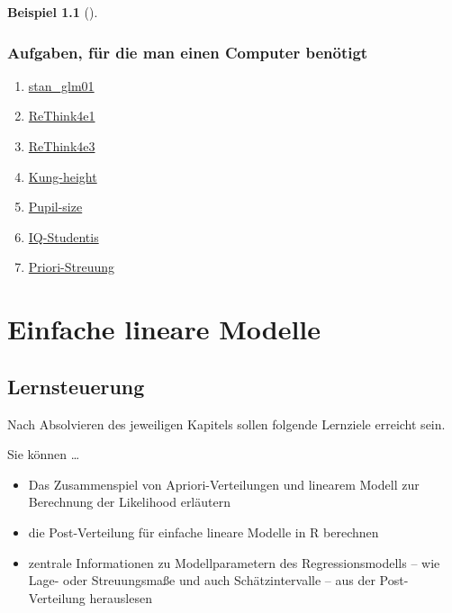 \documentclass[
  ngerman,
  letterpaper,
  twoside,
  open=any]{scrbook}
\providecommand{\tightlist}{%
  \setlength{\itemsep}{0pt}\setlength{\parskip}{0pt}}\usepackage{longtable,booktabs,array}
\theoremstyle{definition}
\newtheorem{example}{Beispiel}[chapter]
\theoremstyle{plain}
\theoremstyle{definition}
\theoremstyle{definition}
\theoremstyle{remark}
\begin{document}
\begin{example}[]
\subsection{Aufgaben, für die man einen Computer
benötigt}\label{aufgaben-fuxfcr-die-man-einen-computer-benuxf6tigt}

\begin{enumerate}
\def\labelenumi{\arabic{enumi}.}
\tightlist
\item
  \href{https://datenwerk.netlify.app/posts/stan_glm01/stan_glm01.html}{stan\_glm01}
\item
  \href{https://datenwerk.netlify.app/posts/rethink4e1/rethink4e1}{ReThink4e1}
\item
  \href{https://datenwerk.netlify.app/posts/rethink4e3/rethink4e3}{ReThink4e3}
\item
  \href{https://datenwerk.netlify.app/posts/kung-height/kung-height}{Kung-height}
\item
  \href{https://datenwerk.netlify.app/posts/pupil-size/pupil-size}{Pupil-size}
\item
  \href{https://datenwerk.netlify.app/posts/iq-studentis/iq-studentis}{IQ-Studentis}
\item
  \href{https://datenwerk.netlify.app/posts/priori-streuung/priori-streuung}{Priori-Streuung}
\end{enumerate}

\chapter{Einfache lineare Modelle}\label{einfache-lineare-modelle}

\section{Lernsteuerung}\label{lernsteuerung-8}

Nach Absolvieren des jeweiligen Kapitels sollen folgende Lernziele
erreicht sein.

Sie können \ldots{}

\begin{itemize}
\tightlist
\item
  Das Zusammenspiel von Apriori-Verteilungen und linearem Modell zur
  Berechnung der Likelihood erläutern
\item
  die Post-Verteilung für einfache lineare Modelle in R berechnen
\item
  zentrale Informationen zu Modellparametern des Regressionsmodells --
  wie Lage- oder Streuungsmaße und auch Schätzintervalle -- aus der
  Post-Verteilung herauslesen
\end{itemize}


\end{example}
\end{document}
